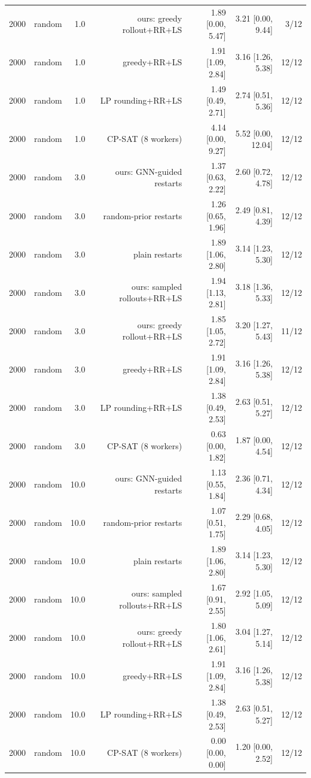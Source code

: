 \begin{table}[t]
\begin{tabular}{llrrrrr}
2000 & random & 1.0 & ours: greedy rollout+RR+LS & 1.89 [0.00, 5.47] & 3.21 [0.00, 9.44] & 3/12 \\
2000 & random & 1.0 & greedy+RR+LS & 1.91 [1.09, 2.84] & 3.16 [1.26, 5.38] & 12/12 \\
2000 & random & 1.0 & LP rounding+RR+LS & 1.49 [0.49, 2.71] & 2.74 [0.51, 5.36] & 12/12 \\
2000 & random & 1.0 & CP-SAT (8 workers) & 4.14 [0.00, 9.27] & 5.52 [0.00, 12.04] & 12/12 \\
2000 & random & 3.0 & ours: GNN-guided restarts & 1.37 [0.63, 2.22] & 2.60 [0.72, 4.78] & 12/12 \\
2000 & random & 3.0 & random-prior restarts & 1.26 [0.65, 1.96] & 2.49 [0.81, 4.39] & 12/12 \\
2000 & random & 3.0 & plain restarts & 1.89 [1.06, 2.80] & 3.14 [1.23, 5.30] & 12/12 \\
2000 & random & 3.0 & ours: sampled rollouts+RR+LS & 1.94 [1.13, 2.81] & 3.18 [1.36, 5.33] & 12/12 \\
2000 & random & 3.0 & ours: greedy rollout+RR+LS & 1.85 [1.05, 2.72] & 3.20 [1.27, 5.43] & 11/12 \\
2000 & random & 3.0 & greedy+RR+LS & 1.91 [1.09, 2.84] & 3.16 [1.26, 5.38] & 12/12 \\
2000 & random & 3.0 & LP rounding+RR+LS & 1.38 [0.49, 2.53] & 2.63 [0.51, 5.27] & 12/12 \\
2000 & random & 3.0 & CP-SAT (8 workers) & 0.63 [0.00, 1.82] & 1.87 [0.00, 4.54] & 12/12 \\
2000 & random & 10.0 & ours: GNN-guided restarts & 1.13 [0.55, 1.84] & 2.36 [0.71, 4.34] & 12/12 \\
2000 & random & 10.0 & random-prior restarts & 1.07 [0.51, 1.75] & 2.29 [0.68, 4.05] & 12/12 \\
2000 & random & 10.0 & plain restarts & 1.89 [1.06, 2.80] & 3.14 [1.23, 5.30] & 12/12 \\
2000 & random & 10.0 & ours: sampled rollouts+RR+LS & 1.67 [0.91, 2.55] & 2.92 [1.05, 5.09] & 12/12 \\
2000 & random & 10.0 & ours: greedy rollout+RR+LS & 1.80 [1.06, 2.61] & 3.04 [1.27, 5.14] & 12/12 \\
2000 & random & 10.0 & greedy+RR+LS & 1.91 [1.09, 2.84] & 3.16 [1.26, 5.38] & 12/12 \\
2000 & random & 10.0 & LP rounding+RR+LS & 1.38 [0.49, 2.53] & 2.63 [0.51, 5.27] & 12/12 \\
2000 & random & 10.0 & CP-SAT (8 workers) & 0.00 [0.00, 0.00] & 1.20 [0.00, 2.52] & 12/12 \\

\end{tabular}
\end{table}
